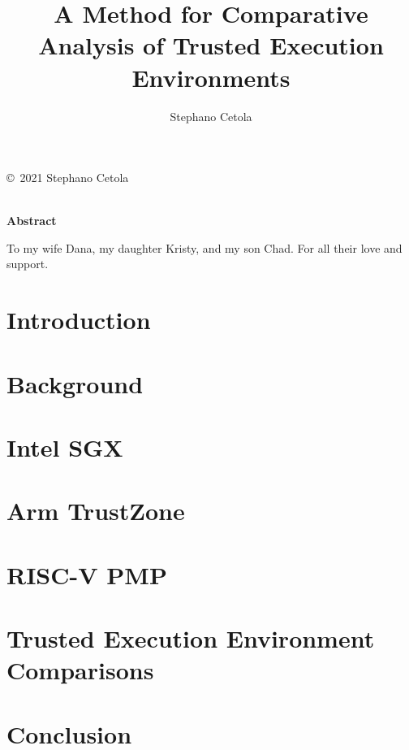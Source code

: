 \documentclass[12pt,oneside,letterpaper,hidelinks]{PSUreport}
\begin{document}
\title{A Method for Comparative Analysis of Trusted Execution Environments}
\subtitle{}
\author{Stephano Cetola}
\submitdate{\today}

\copyrightfalse
\figurespagetrue
\tablespagetrue
\beforepreface
{}
\null\vfill
\begin{center}
        \copyright\ 2021 Stephano Cetola \\
        \doclicenseLongText \\
        \vspace{5 mm}
        \doclicenseImage
\end{center}
\vfill\newpage
{}
\centerline{\textbf{Abstract}}

To my wife Dana, my daughter Kristy, and my son Chad. For all their love and support.

\afterpreface

\printglossary
\printglossary[type=\acronymtype]


\glsresetall
\chapter{Introduction}
\label{chap:intro}


\glsresetall
\chapter{Background}
\label{chap:bg}


\glsresetall
\chapter{Intel SGX}
\label{chap:sgx}


\glsresetall
\chapter{Arm TrustZone}
\label{chap:trustzone}


\glsresetall
\chapter{RISC-V PMP}
\label{chap:pmp}


\glsresetall
\chapter{Trusted Execution Environment Comparisons}
\label{chap:comp}


\glsresetall
\chapter{Conclusion}
\label{chap:fini}




\end{document}
